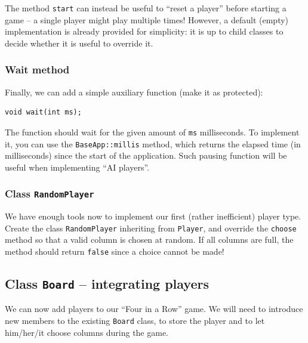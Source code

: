 \documentclass{article}
\begin{document}
The method \texttt{start} can instead be useful to ``reset a player'' before starting a game -- a single player might play multiple times! However, a default (empty) implementation is already provided for simplicity: it is up to child classes to decide whether it is useful to override it.



\subsubsection{Wait method}

Finally, we can add a simple auxiliary function (make it as protected):
\begin{center}
\begin{minipage}{.9\textwidth}
\begin{lstlisting}[style=mycpp,numbers=none]
void wait(int ms);
\end{lstlisting}
\end{minipage}
\end{center}
The function should wait for the given amount of \texttt{ms} milliseconds. To implement it, you can use the \texttt{BaseApp}\texttt{::}\texttt{millis} method, which returns the elapsed time (in milliseconds) since the start of the application. Such pausing function will be useful when implementing ``AI players''.



\subsubsection{Class \texttt{RandomPlayer}}

We have enough tools now to implement our first (rather inefficient) player type. Create the class \texttt{RandomPlayer} inheriting from \texttt{Player}, and override the \texttt{choose} method so that a valid column is chosen at random. If all columns are full, the method should return \texttt{false} since a choice cannot be made!






\subsection{Class \texttt{Board} -- integrating players}

We can now add players to our ``Four in a Row'' game. We will need to introduce new members to the existing \texttt{Board} class, to store the player and to let him/her/it choose columns during the game.
\end{document}
